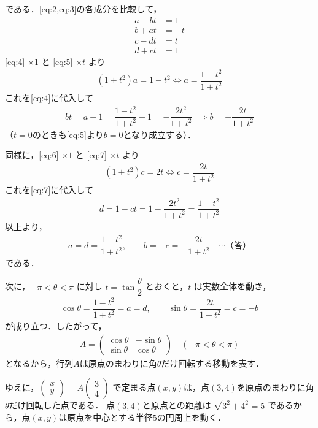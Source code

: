 \documentclass[../../main.tex]{subfiles}
\begin{document}
である．\cref{eq:2,eq:3}の各成分を比較して，
\begin{align}
  a-bt &= 1 \label{eq:4} \\
  b+at &= -t \label{eq:5} \\
  c-dt &= t \label{eq:6} \\
  d+ct &= 1 \label{eq:7}
\end{align}
\cref{eq:4} $\times 1$ と \cref{eq:5} $\times t$ より
\begin{align}
  (1+t^2)a = 1-t^2 \iff a = \dfrac{1-t^2}{1+t^2}
\end{align}
これを\cref{eq:4}に代入して
\begin{align}
  bt = a-1 = \dfrac{1-t^2}{1+t^2} - 1 = -\dfrac{2t^2}{1+t^2} \implies b = -\dfrac{2t}{1+t^2}
\end{align}
（$t=0$のときも\cref{eq:5}より$b=0$となり成立する）．

同様に，\cref{eq:6} $\times 1$ と \cref{eq:7} $\times t$ より
\begin{align}
  (1+t^2)c = 2t \iff c = \dfrac{2t}{1+t^2}
\end{align}
これを\cref{eq:7}に代入して
\begin{align}
  d = 1-ct = 1-\dfrac{2t^2}{1+t^2} = \dfrac{1-t^2}{1+t^2}
\end{align}
以上より，
\begin{align}
  a = d = \dfrac{1-t^2}{1+t^2}, \qquad b = -c = -\dfrac{2t}{1+t^2} \quad \cdots\text{（答）}
\end{align}
である．

次に，$-\pi < \theta < \pi$ に対し $t = \tan\dfrac{\theta}{2}$ とおくと，$t$ は実数全体を動き，
\begin{align}
  \cos\theta = \dfrac{1-t^2}{1+t^2} = a = d, \qquad \sin\theta = \dfrac{2t}{1+t^2} = c = -b
\end{align}
が成り立つ．したがって，
\begin{align}
  A =
  \begin{pmatrix} \cos\theta & -\sin\theta \\ \sin\theta & \cos\theta
  \end{pmatrix} \quad (-\pi < \theta < \pi)
\end{align}
となるから，行列$A$は原点のまわりに角$\theta$だけ回転する移動を表す．

ゆえに，$
\begin{pmatrix} x \\ y
\end{pmatrix} = A
\begin{pmatrix} 3 \\ 4
\end{pmatrix}$ で定まる点$(x,y)$は，点$(3,4)$を原点のまわりに角$\theta$だけ回転した点である．
点$(3,4)$と原点との距離は $\sqrt{3^2+4^2}=5$ であるから，点$(x,y)$は原点を中心とする半径$5$の円周上を動く．
\end{document}

